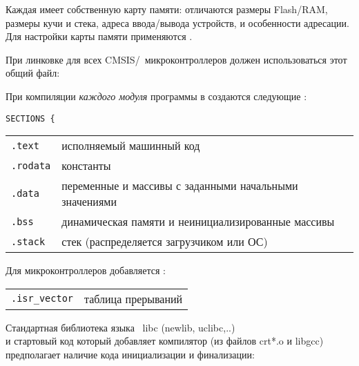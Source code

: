 \pagebreak
{}\label{ld}\secdown

Каждая  имеет собственную карту памяти: отличаются размеры
Flash/RAM, размеры кучи и стека, адреса ввода/вывода устройств, и особенности
адресации. Для настройки карты памяти применяются .




\bigskip\noindent
При линковке для всех CMSIS/\cm{}\ микроконтроллеров должен использоваться этот
общий файл:



\pagebreak
{}

При компиляции \emph{каждого модуля} программы в 
создаются следующие :

\begin{lstlisting}
SECTIONS {
\end{lstlisting}

\begin{tabular}{l l}
\verb|.text| & исполняемый машинный код \\
\verb|.rodata| & константы \\
\verb|.data| & переменные и массивы с заданными начальными значениями \\
\verb|.bss| & динамическая памяти и неинициализированные массивы \\
\verb|.stack| & стек (распределяется загрузчиком или ОС) \\
\end{tabular}

\bigskip
\noindent Для микроконтроллеров добавляется :\bigskip

\begin{tabular}{l l}
\verb|.isr_vector| & таблица прерываний \\
\end{tabular}

\bigskip
\noindent Стандартная библиотека языка \purec\ libc (newlib, uclibc,..)\\ и
стартовый код который добавляет компилятор (из файлов crt*.o и libgcc)\\
предполагает наличие кода инициализации и финализации:\bigskip

